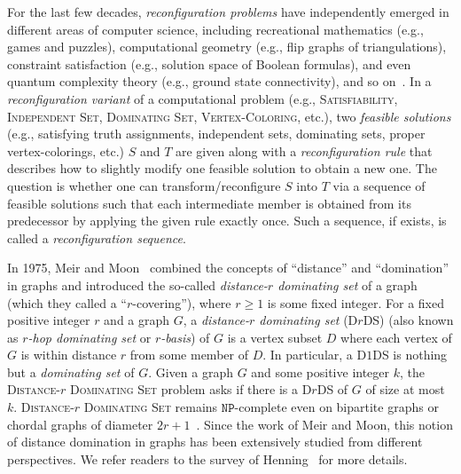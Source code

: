 \documentclass[a4paper]{article}
\theoremstyle{plain}
\theoremstyle{definition}
\newcommand{\ttNP}{{\mathtt{NP}}}
\begin{document}
For the last few decades, \textit{reconfiguration problems} have independently emerged in different areas of computer science, including recreational mathematics (e.g., games and puzzles), computational geometry (e.g., flip graphs of triangulations), constraint satisfaction (e.g., solution space of Boolean formulas), and even quantum complexity theory (e.g., ground state connectivity), and so on~\cite{Heuvel13,Nishimura18,MynhardtN19,BousquetMNS22}.	
In a \textit{reconfiguration variant} of a computational problem (e.g., \textsc{Satisfiability}, \textsc{Independent Set}, \textsc{Dominating Set}, \textsc{Vertex-Coloring}, etc.), two \textit{feasible solutions} (e.g., satisfying truth assignments, independent sets, dominating sets, proper vertex-colorings, etc.) $S$ and $T$ are given along with a \textit{reconfiguration rule} that describes how to slightly modify one feasible solution to obtain a new one.
The question is whether one can transform/reconfigure $S$ into $T$ via a sequence of feasible solutions such that each intermediate member is obtained from its predecessor by applying the given rule exactly once.
Such a sequence, if exists, is called a \textit{reconfiguration sequence}.

In 1975, Meir and Moon~\cite{MeirM75} combined the concepts of ``distance'' and ``domination'' in graphs and introduced the so-called \textit{distance-$r$ dominating set} of a graph (which they called a ``$r$-covering''), where $r \geq 1$ is some fixed integer.
For a fixed positive integer $r$ and a graph $G$, a \textit{distance-$r$ dominating set} (D$r$DS) (also known as \textit{$r$-hop dominating set} or \textit{$r$-basis}) of $G$ is a vertex subset $D$ where each vertex of $G$ is within distance $r$ from some member of $D$.
In particular, a D$1$DS is nothing but a \textit{dominating set} of $G$.
Given a graph $G$ and some positive integer $k$, the \textsc{Distance-$r$ Dominating Set} problem asks if there is a D$r$DS of $G$ of size at most $k$.
\textsc{Distance-$r$ Dominating Set} remains $\ttNP$-complete even on bipartite graphs or chordal graphs of diameter $2r + 1$~\cite{ChangN84}.
Since the work of Meir and Moon, this notion of distance domination in graphs has been extensively studied from different perspectives.
We refer readers to the survey of Henning~\cite{Henning20} for more details.
\end{document}
